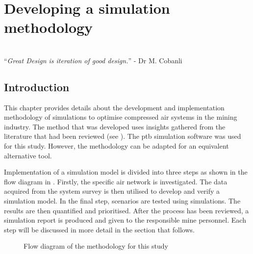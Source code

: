 \chapter{Developing a simulation methodology}
\thispagestyle{empty}
\vspace{40em}
\hrulefill
\\
\enquote{\textit{Great Design is iteration of good design.}} - Dr M. Cobanli\\
\newpage
\section{Introduction}
This chapter provides details about the development and implementation methodology of simulations to optimise compressed air systems in the mining industry. The method that was developed uses insights gathered from the literature that had been reviewed (see ). The \gls{ptb} simulation software was used for this study. However, the methodology can be adapted for an equivalent alternative tool.
\par 
Implementation of a simulation model is divided into three steps as shown in the flow diagram in . Firstly, the specific air network is investigated. The data acquired from the system survey is then utilised to develop and verify a simulation model. In the final step, scenarios are tested using simulations. The results are then quantified and prioritised. After the process has been reviewed, a simulation report is produced and given to the responsible mine personnel. Each step will be discussed in more detail in the section that follows.

\begin{figure}[h]
	\centering
	\caption{Flow diagram of the methodology for this study}
	\label{fig: Methodology}
\end{figure}
